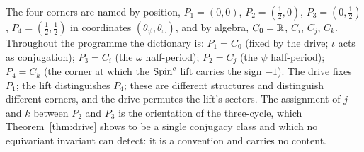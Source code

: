\documentclass[11pt,a4paper]{article}
\theoremstyle{plain}
\theoremstyle{definition}
\theoremstyle{remark}
\begin{document}
The four corners are named by position, $P_{1}=(0,0)$, $P_{2}=(\tfrac12,0)$, $P_{3}=(0,\tfrac12)$, $P_{4}=(\tfrac12,\tfrac12)$ in coordinates $(\theta_{\psi},\theta_{\omega})$, and by algebra, $C_{0}=\mathbb{R}$, $C_{i}$, $C_{j}$, $C_{k}$. Throughout the programme the dictionary is: $P_{1}=C_{0}$ (fixed by the drive; $\iota$ acts as conjugation); $P_{3}=C_{i}$ (the $\omega$ half-period); $P_{2}=C_{j}$ (the $\psi$ half-period); $P_{4}=C_{k}$ (the corner at which the $\text{Spin}^c$ lift carries the sign $-1$). The drive fixes $P_{1}$; the lift distinguishes $P_{4}$; these are different structures and distinguish different corners, and the drive permutes the lift's sectors. The assignment of $j$ and $k$ between $P_{2}$ and $P_{3}$ is the orientation of the three-cycle, which Theorem~\ref{thm:drive} shows to be a single conjugacy class and which no equivariant invariant can detect: it is a convention and carries no content.
\end{document}
